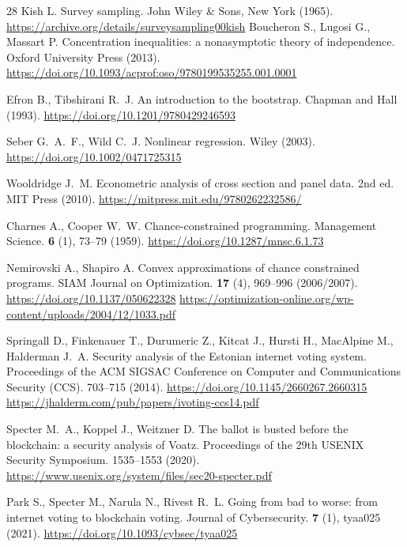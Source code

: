 \begin{thebibliography}{28}
Kish L. Survey sampling. John Wiley \& Sons, New York (1965).
\url{https://archive.org/details/surveysampling00kish}
Boucheron S., Lugosi G., Massart P. Concentration inequalities: a nonasymptotic
theory of independence. Oxford University Press (2013).
\url{https://doi.org/10.1093/acprof:oso/9780199535255.001.0001}

Efron B., Tibshirani R.~J. An introduction to the bootstrap. Chapman and Hall
(1993).
\url{https://doi.org/10.1201/9780429246593}

Seber G.~A.~F., Wild C.~J. Nonlinear regression. Wiley (2003).
\url{https://doi.org/10.1002/0471725315}

Wooldridge J.~M. Econometric analysis of cross section and panel data.
2nd ed. MIT Press (2010).
\url{https://mitpress.mit.edu/9780262232586/}

Charnes A., Cooper W.~W. Chance-constrained programming. Management Science.
\textbf{6} (1), 73--79 (1959).
\url{https://doi.org/10.1287/mnsc.6.1.73}

Nemirovski A., Shapiro A. Convex approximations of chance constrained programs.
SIAM Journal on Optimization. \textbf{17} (4), 969--996 (2006/2007).
\url{https://doi.org/10.1137/050622328}
\url{https://optimization-online.org/wp-content/uploads/2004/12/1033.pdf}

Springall D., Finkenauer T., Durumeric Z., Kitcat J., Hursti H., MacAlpine M.,
Halderman J.~A. Security analysis of the Estonian internet voting system.
Proceedings of the ACM SIGSAC Conference on Computer and Communications Security
(CCS). 703--715 (2014).
\url{https://doi.org/10.1145/2660267.2660315}
\url{https://jhalderm.com/pub/papers/ivoting-ccs14.pdf}

Specter M.~A., Koppel J., Weitzner D. The ballot is busted before the
blockchain: a security analysis of Voatz. Proceedings of the 29th USENIX
Security Symposium. 1535--1553 (2020).
\url{https://www.usenix.org/system/files/sec20-specter.pdf}

Park S., Specter M., Narula N., Rivest R.~L. Going from bad to worse: from
internet voting to blockchain voting. Journal of Cybersecurity. \textbf{7} (1),
tyaa025 (2021).
\url{https://doi.org/10.1093/cybsec/tyaa025}


\end{thebibliography}
